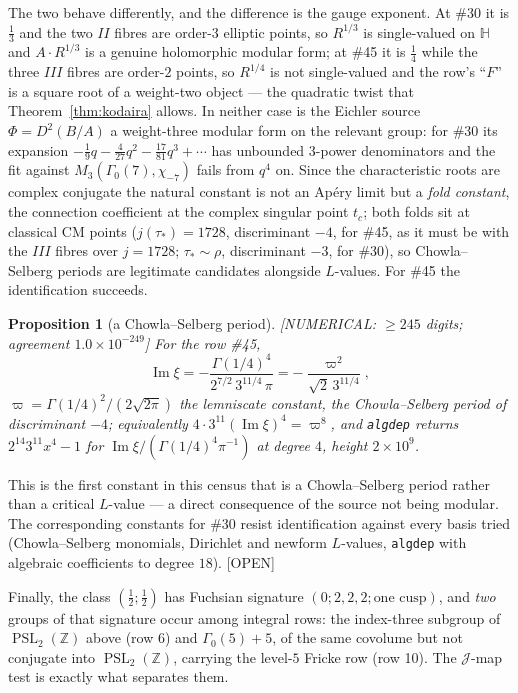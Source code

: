 \documentclass[11pt,reqno]{amsart}
\theoremstyle{plain}
\newtheorem{proposition}[theorem]{Proposition}
\theoremstyle{definition}
\theoremstyle{remark}
\theoremstyle{plain}
\newcommand{\Z}{\mathbb{Z}}
\newcommand{\HH}{\mathbb{H}}
\DeclareMathOperator{\PSL}{PSL}
\newcommand{\Numerical}[1]{\textup{\textsf{[NUMERICAL: #1]}}}
\newcommand{\Open}{\textup{\textsf{[OPEN]}}}
\begin{document}
The two behave differently, and the difference is the gauge exponent. At \#30
it is $\tfrac13$ and the two $II$ fibres are order-$3$ elliptic points, so
$R^{1/3}$ is single-valued on $\HH$ and $A\cdot R^{1/3}$ is a genuine holomorphic
modular form; at \#45 it is $\tfrac14$ while the three $III$ fibres are
order-$2$ points, so $R^{1/4}$ is not single-valued and the row's ``$F$'' is a
square root of a weight-two object --- the quadratic twist that
Theorem~\ref{thm:kodaira} allows. In neither case is the Eichler source
$\Phi=D^2(B/A)$ a weight-three modular form on the relevant group: for \#30 its
expansion $-\tfrac19q-\tfrac4{27}q^2-\tfrac{17}{81}q^3+\cdots$ has unbounded
$3$-power denominators and the fit against $M_3(\Gamma_0(7),\chi_{-7})$ fails
from $q^4$ on. Since the characteristic roots are complex conjugate the natural
constant is not an Ap\'ery limit but a \emph{fold constant}, the connection
coefficient at the complex singular point $t_c$; both folds sit at classical CM
points ($j(\tau_*)=1728$, discriminant $-4$, for \#45, as it must be with the
$III$ fibres over $j=1728$; $\tau_*\sim\rho$, discriminant $-3$, for \#30), so
Chowla--Selberg periods are legitimate candidates alongside $L$-values. For \#45
the identification succeeds.

\begin{proposition}[a Chowla--Selberg period]\label{prop:CS}
\Numerical{$\ge245$ digits; agreement $1.0\times10^{-249}$} For the row \#45,
\[
\operatorname{Im}\xi=-\frac{\Gamma(1/4)^4}{2^{7/2}\,3^{11/4}\,\pi}
=-\frac{\varpi^2}{\sqrt2\,3^{11/4}},
\]
$\varpi=\Gamma(1/4)^2/(2\sqrt{2\pi})$ the lemniscate constant, the
Chowla--Selberg period of discriminant $-4$; equivalently
$4\cdot3^{11}(\operatorname{Im}\xi)^4=\varpi^8$, and \texttt{algdep} returns
$2^{14}3^{11}x^4-1$ for $\operatorname{Im}\xi/(\Gamma(1/4)^4\pi^{-1})$ at degree
$4$, height $2\times10^9$.
\end{proposition}

This is the first constant in this census that is a Chowla--Selberg period rather
than a critical $L$-value --- a direct consequence of the source not being
modular. The corresponding constants for \#30 resist identification against every
basis tried (Chowla--Selberg monomials, Dirichlet and newform $L$-values,
\texttt{algdep} with algebraic coefficients to degree $18$). \Open{}

Finally, the class $(\tfrac12;\tfrac12)$ has Fuchsian signature
$(0;2,2,2;\text{one cusp})$, and \emph{two} groups of that signature occur among
integral rows: the index-three subgroup of $\PSL_2(\Z)$ above (row 6) and
$\Gamma_0(5)+5$, of the same covolume but not conjugate into $\PSL_2(\Z)$,
carrying the level-$5$ Fricke row (row 10). The $\mathcal J$-map test is exactly
what separates them.
\end{document}
